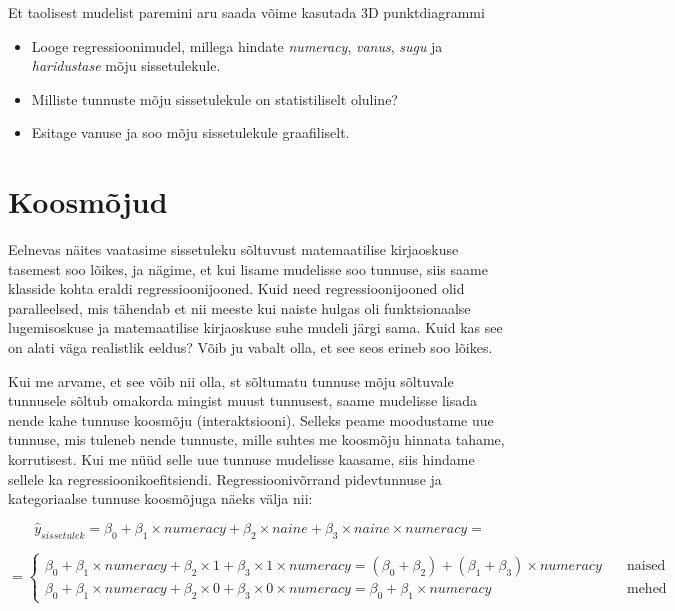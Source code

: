 \documentclass[
]{book}
\newenvironment{Shaded}{\begin{snugshade}}{\end{snugshade}}
\newcommand{\CommentTok}[1]{\textcolor[rgb]{0.56,0.35,0.01}{\textit{#1}}}
\providecommand{\tightlist}{%
  \setlength{\itemsep}{0pt}\setlength{\parskip}{0pt}}
\begin{document}
Et taolisest mudelist paremini aru saada võime kasutada 3D punktdiagrammi

\begin{Shaded}
\end{Shaded}

\begin{itemize}
\tightlist
\item
  Looge regressioonimudel, millega hindate \emph{numeracy}, \emph{vanus}, \emph{sugu} ja \emph{haridustase} mõju sissetulekule.
\item
  Milliste tunnuste mõju sissetulekule on statistiliselt oluline?
\item
  Esitage vanuse ja soo mõju sissetulekule graafiliselt.
\end{itemize}

\hypertarget{koosmuxf5jud}{%
\section{Koosmõjud}\label{koosmuxf5jud}}

Eelnevas näites vaatasime sissetuleku sõltuvust matemaatilise kirjaoskuse tasemest soo lõikes, ja nägime, et kui lisame mudelisse soo tunnuse, siis saame klasside kohta eraldi regressioonijooned. Kuid need regressioonijooned olid paralleelsed, mis tähendab et nii meeste kui naiste hulgas oli funktsionaalse lugemisoskuse ja matemaatilise kirjaoskuse suhe mudeli järgi sama. Kuid kas see on alati väga realistlik eeldus? Võib ju vabalt olla, et see seos erineb soo lõikes.

Kui me arvame, et see võib nii olla, st sõltumatu tunnuse mõju sõltuvale tunnusele sõltub omakorda mingist muust tunnusest, saame mudelisse lisada nende kahe tunnuse koosmõju (interaktsiooni). Selleks peame moodustame uue tunnuse, mis tuleneb nende tunnuste, mille suhtes me koosmõju hinnata tahame, korrutisest. Kui me nüüd selle uue tunnuse mudelisse kaasame, siis hindame sellele ka regressioonikoefitsiendi. Regressioonivõrrand pidevtunnuse ja kategoriaalse tunnuse koosmõjuga näeks välja nii:

\[\hat{y}_{sissetulek}=\beta_0+\beta_1 \times numeracy + \beta_2 \times naine + \beta_3 \times naine \times numeracy =\]

\[ 
=
  \begin{cases}
    \beta_0+\beta_1 \times numeracy + \beta_2 \times 1 + \beta_3 \times 1 \times numeracy = (\beta_0+\beta_2)+(\beta_1+\beta_3) \times numeracy  & \quad \text{naised}\\
    \beta_0+\beta_1 \times numeracy + \beta_2 \times 0 + \beta_3 \times 0 \times numeracy = \beta_0+\beta_1 \times numeracy & \quad \text{mehed}
  \end{cases}
\]
\end{document}
